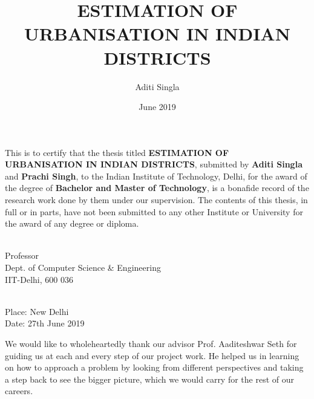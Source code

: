 \documentclass[Dual]{iitddiss}
\begin{document}

\title{ESTIMATION OF URBANISATION IN INDIAN DISTRICTS}

\author{Aditi Singla}
\date{June 2019}

\maketitle

\certificate

\vspace*{0.5in}

\noindent This is to certify that the thesis titled {\bf ESTIMATION OF 
URBANISATION IN INDIAN DISTRICTS}, submitted by {\bf Aditi Singla} and 
{\bf Prachi Singh}, to the Indian Institute of Technology, Delhi, for
the award of the degree of {\bf Bachelor and Master of Technology}, is 
a bonafide record of the research work done by them under our supervision. 
The contents of this thesis, in full or in parts, have not been submitted
to any other Institute or University for the award of any degree or
diploma.

\vspace*{3in}

\begin{singlespacing}
 \\
\noindent Professor \\
\noindent Dept. of Computer Science \& Engineering\\
\noindent IIT-Delhi, 600 036 \\
\end{singlespacing}
\vspace*{0.25in}
\\
\noindent Place: New Delhi \\
\noindent Date: 27th June 2019


\acknowledgements

We would like to wholeheartedly thank our advisor Prof. Aaditeshwar Seth 
for guiding us at each and every step of our project work. He helped us 
in learning on how to approach a problem by looking from different 
perspectives and taking a step back to see the bigger picture, which we 
would carry for the rest of our careers.   
\end{document}
